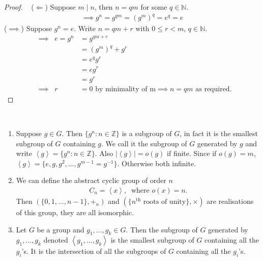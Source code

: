 \begin{proof} ~
($\Longleftarrow$) Suppose $m \mid n$, then $n = qm$ for some $q \in \mathbb{N}$.
\begin{align*}
    \implies g^n = g^{qm} = (g^m)^q = e^q = e
\end{align*}
($\implies$) Suppose $g^n = e$. Write $n = qm + r$ with $0 \leq r < m$, $q \in \mathbb{N}$.
\begin{align*}
    &\implies & e = g^n &= g^{qm + r} \\
    && &= (g^m)^q + g^r \\
    && &= e^q g^r \\
    && &= e g^r \\
    && &= g^r \\
    &\implies & r &= 0 \text{ by minimality of m} \implies n = qm \text{ as required.} 
\end{align*}
\end{proof}

\begin{remark} ~
\begin{enumerate}
\def\labelenumi{\roman{enumi}.}
\item
  Suppose $g \in G$. Then $\{ g^n : n \in \mathbb{Z} \}$ is a subgroup of $G$, in fact it is the smallest subgroup of $G$ containing $g$.
  We call it the subgroup of $G$ generated by $g$ and write $\left\langle g \right\rangle = \{ g^n : n \in \mathbb{Z} \}$. Also $|\left\langle g \right\rangle| = o(g)$ if finite.
  Since if $o(g) = m$, $\left\langle g \right\rangle = \{ e, g, g^2, \dots, g^{m-1} = g^{-1 }\}$.
  Otherwise both infinite.
\item
  We can define the abstract cyclic group of order $n$
  \begin{align*}
  C_n = \left\langle x \right\rangle,\ \text{ where } o(x) = n.
  \end{align*}
  Then $( \{ 0, 1, \dots, n-1 \}, +_n)$ and $( \{ n^{\text{th}} \text{ roots of unity}\}, \times)$ are realisations of this group, they are all isomorphic.
\item
  Let $G$ be a group and $g_1, \dots, g_k \in G$. Then the subgroup of $G$ generated by $g_1, \dots, g_k$ denoted $\left\langle g_1, \dots, g_k \right\rangle$ is the smallest subgroup of $G$ containing all the $g_i$'s. It is the intersection of all the subgroups of $G$ containing all the $g_i$'s.
\end{enumerate}

\end{remark}